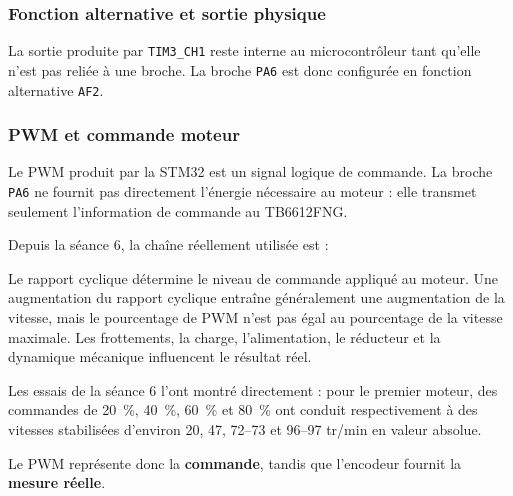 \documentclass[11pt,a4paper]{article}
\begin{document}
	\subsubsection*{Fonction alternative et sortie physique}
	
	La sortie produite par \texttt{TIM3\_CH1} reste interne au microcontrôleur tant qu'elle n'est pas reliée à une broche. La broche \texttt{PA6} est donc configurée en fonction alternative \texttt{AF2}.
	
	\begin{center}
	\end{center}
	
	\subsubsection*{PWM et commande moteur}
	
	Le PWM produit par la STM32 est un signal logique de commande. La broche \texttt{PA6} ne fournit pas directement l'énergie nécessaire au moteur : elle transmet seulement l'information de commande au TB6612FNG.
	
	Depuis la séance 6, la chaîne réellement utilisée est :
	
	\begin{center}
	\end{center}
	
	Le rapport cyclique détermine le niveau de commande appliqué au moteur. Une augmentation du rapport cyclique entraîne généralement une augmentation de la vitesse, mais le pourcentage de PWM n'est pas égal au pourcentage de la vitesse maximale. Les frottements, la charge, l'alimentation, le réducteur et la dynamique mécanique influencent le résultat réel.
	
	Les essais de la séance 6 l'ont montré directement : pour le premier moteur, des commandes de 20~\%, 40~\%, 60~\% et 80~\% ont conduit respectivement à des vitesses stabilisées d'environ 20, 47, 72--73 et 96--97 tr/min en valeur absolue.
	
	Le PWM représente donc la \textbf{commande}, tandis que l'encodeur fournit la \textbf{mesure réelle}.
	
\end{document}
